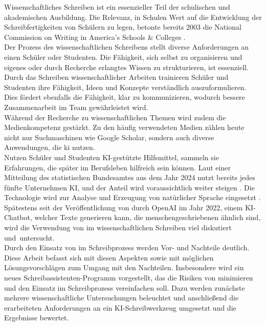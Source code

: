 \documentclass[../main.tex]{subfiles}
\begin{document}
Wissenschaftliches Schreiben ist ein essenzieller Teil der schulischen und akademischen Ausbildung. Die Relevanz, in Schulen Wert auf die Entwicklung der Schreibfertigkeiten von Schülern zu legen, 
betonte bereits 2003 die National Commission on Writing in America’s Schools \& Colleges \cite{nationalcommissionwriting}.\\
Der Prozess des wissenschaftlichen Schreibens stellt diverse 
Anforderungen an einen Schüler oder Studenten. Die Fähigkeit, sich selbst zu organisieren und eigenes oder durch Recherche erlangtes Wissen zu strukturieren, ist essenziell. Durch das 
Schreiben wissenschaftlicher Arbeiten trainieren Schüler und Studenten ihre Fähigkeit, Ideen und Konzepte verständlich auszuformulieren. Dies fördert ebenfalls die Fähigkeit, klar zu 
kommunizieren, wodurch bessere Zusammenarbeit im Team gewährleistet wird. \cite{nationalcommissionwriting,teachers,humanWritingToAi} \\ 
Während der Recherche zu wissenschaftlichen Themen wird zudem die Medienkompetenz gestärkt. Zu den häufig verwendeten Medien zählen heute nicht nur Suchmaschinen wie Google Scholar, sondern 
auch diverse Anwendungen, die \gls{ki} nutzen.\\ Nutzen Schüler und Studenten KI-gestützte Hilfsmittel, sammeln sie Erfahrungen, die später im Berufsleben hilfreich sein können. Laut 
einer Mitteilung des statistischen Bundesamtes aus dem Jahr 2024 nutzt bereits jedes fünfte Unternehmen KI, und der Anteil wird voraussichtlich weiter steigen \cite{statistischesBundesamt}. 
Die Technologie wird zur Analyse und Erzeugung von natürlicher Sprache eingesetzt \cite{statistischesBundesamt}.\\ 
Spätestens seit der Veröffentlichung von  durch OpenAI im Jahr 2022, einem KI-Chatbot, welcher Texte generieren kann, die menschengeschriebenen ähnlich sind, wird die Verwendung von 
 im wissenschaftlichen Schreiben viel diskutiert \mbox{und untersucht. \cite{humanWritingToAi,ZukunftWissenschaftlichesPublizieren}}\\
Durch den Einsatz von  im Schreibprozess werden Vor- und Nachteile deutlich. Diese Arbeit befasst sich mit 
diesen Aspekten sowie mit möglichen Lösungsvorschlägen zum Umgang mit den Nachteilen. Insbesondere wird ein neues Schreibassistenten-Programm vorgestellt, das 
die Risiken von  minimieren und den Einsatz im Schreibprozess vereinfachen soll. Dazu werden zunächste mehrere wissenschaftliche Untersuchungen beleuchtet und anschließend die erarbeiteten Anforderungen an ein KI-Schreibwerkzeug
umgesetzt und die Ergebnisse bewertet.
\end{document}
